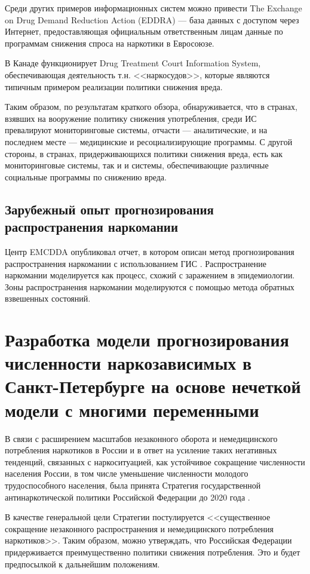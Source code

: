 \documentclass[a4paper,14pt]{article}
\begin{document}
Среди других примеров информационных систем можно привести The Exchange on Drug 
Demand Reduction Action (EDDRA) --- база данных с доступом через Интернет, 
предоставляющая официальным ответственным лицам данные по программам снижения 
спроса на наркотики в Евросоюзе.

В Канаде функционирует Drug Treatment Court Information System, обеспечивающая 
деятельность т.н. <<наркосудов>>, которые являются типичным примером реализации 
политики снижения вреда.

Таким образом, по результатам краткого обзора, обнаруживается, что в странах, 
взявших на вооружение политику снижения употребления, среди ИС превалируют 
мониторинговые системы, отчасти --- аналитические, и на последнем месте --- 
медицинские и ресоциализирующие программы.
С другой стороны, в странах, придерживающихся политики снижения вреда, есть как 
мониторинговые системы, так и и системы, обеспечивающие различные социальные 
программы по снижению вреда.

\subsection{Зарубежный опыт прогнозирования распространения наркомании}

Центр EMCDDA опубликовал отчет, в котором описан метод прогнозирования
распространения наркомании с использованием ГИС \cite{Wiessing1999}.
Распространение наркомании моделируется как процесс, схожий с заражением 
в эпидемиологии. Зоны распространения наркомании моделируются с помощью метода 
обратных взвешенных состояний.


\section{Разработка модели прогнозирования численности наркозависимых в 
    Санкт-Петербурге на основе нечеткой модели с многими переменными}

В связи с расширением масштабов незаконного оборота и немедицинского потребления 
наркотиков  в России и в ответ на усиление таких негативных тенденций, связанных 
с наркоситуацией, как устойчивое сокращение численности населения России, в том 
числе уменьшение численности молодого трудоспособного населения, была принята 
Стратегия государственной антинаркотической политики
Российской Федерации до 2020 года \cite{ru_nat_drug_strat}. 

В качестве генеральной цели Стратегии постулируется <<существенное сокращение 
незаконного распространения и немедицинского потребления наркотиков>>. Таким 
образом, можно утверждать, что Российская Федерации придерживается 
преимущественно политики снижения потребления. Это и будет предпосылкой к 
дальнейшим положениям.
\end{document}

